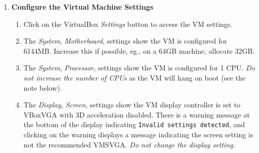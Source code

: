 \begin{enumerate}
\begin{enumerate}
\item Unzip the 15.5GB file \verb+Xilinx_ISE_14.7_Win10_14.7_VM_0213_1.zip+
\newline 
The zip file can be unzipped onto a USB drive (eg., a 1TB Samsung T7 SSD).
Unzipping takes a few minutes.
\item The Open Virtualization Archive (OVA) is located in the unzipped directory
\newline
\verb+Xilinx_ISE_14.7_Win10_14.7_VM_0213_1\ova\14.7_VM.ova+
\item Start VirtualBox
\item Use VirtualBox \emph{File$\rightarrow$Import Appliance} to import the OVA file.
\item The default VM name is \verb+ISE_14.7_VM_base+. Rename it \verb+ISE_14.7_VM+.
\item (Optional) Change the \emph{Machine Base Folder}. The imported VM requires 39.7GB. 
The machine base folder can be located on an external USB SSD. The VM is imported 
into the folder \verb+ISE_14.7_VM+, so the machine base folder should not 
include the VM name.
\item Click \emph{Finish} to import the VM. Importing takes a few minutes.
\item The VirtualBox then displays a new \verb+ISE_14.7_VM+ entry, with the
virtual machine in the \verb+Powered Off+ state.
\end{enumerate}
%
\item \textbf{Configure the Virtual Machine Settings}
%
\begin{enumerate}
\item Click on the VirtualBox \emph{Settings} button to access the VM settings.
\item The \emph{System}, \emph{Motherboard}, settings show the VM is configured
for 6144MB. Increase this if possible, eg., on a 64GB machine, allocate 32GB.
\item The \emph{System}, \emph{Processor}, settings show the VM is configured
for 1 CPU. \emph{Do not increase the number of CPUs} as the VM will hang on
boot (see the note below). 
\item The \emph{Display}, \emph{Screen}, settings show the VM display controller
is set to VBoxVGA with 3D acceleration disabled. There is a warning message at
the bottom of the display indicating \verb+Invalid settings detected+, and clicking
on the warning displays a message indicating the screen setting is not the 
recommended VMSVGA. \emph{Do not change the display setting.}

\end{enumerate}
\end{enumerate}
